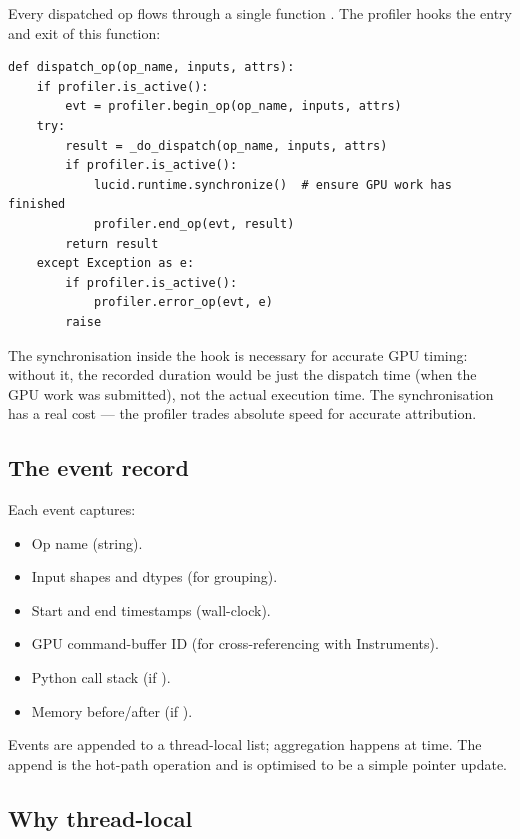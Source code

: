 Every dispatched op flows through a single function
. The profiler hooks the entry and
exit of this function:

\begin{lstlisting}[style=lucid,language=LucidPython]
def dispatch_op(op_name, inputs, attrs):
    if profiler.is_active():
        evt = profiler.begin_op(op_name, inputs, attrs)
    try:
        result = _do_dispatch(op_name, inputs, attrs)
        if profiler.is_active():
            lucid.runtime.synchronize()  # ensure GPU work has finished
            profiler.end_op(evt, result)
        return result
    except Exception as e:
        if profiler.is_active():
            profiler.error_op(evt, e)
        raise
\end{lstlisting}

The synchronisation inside the hook is necessary for accurate
GPU timing: without it, the recorded duration would be just
the dispatch time (when the GPU work was submitted), not the
actual execution time. The synchronisation has a real cost ---
the profiler trades absolute speed for accurate attribution.

\subsection{The event record}
\label{ssec:profiler_determinism:event_record}

Each event captures:
\begin{itemize}
  \item Op name (string).
  \item Input shapes and dtypes (for grouping).
  \item Start and end timestamps (wall-clock).
  \item GPU command-buffer ID (for cross-referencing with
    Instruments).
  \item Python call stack (if ).
  \item Memory before/after (if ).
\end{itemize}

Events are appended to a thread-local list; aggregation happens
at  time. The append is the
hot-path operation and is optimised to be a simple pointer
update.

\subsection{Why thread-local}
\label{ssec:profiler_determinism:thread_local}

